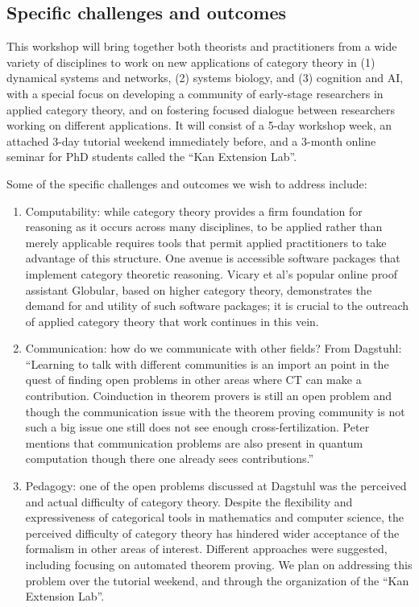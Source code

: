 \documentclass{article}
\newcommand{\redout}[1]{{\color{red}#1}}
\begin{document}

\subsection{Specific challenges and outcomes}
This workshop will bring together both theorists and practitioners from a wide variety of disciplines to work on new applications of category theory in (1) dynamical systems and networks, (2) systems biology, and (3) cognition and AI, with a special focus on developing a community of early-stage researchers in applied category theory, and on fostering focused dialogue between researchers working on different applications. It will consist of a 5-day workshop week, an attached 3-day tutorial weekend immediately before, and a 3-month online seminar for PhD students called the ``Kan Extension Lab''.

Some of the specific challenges and outcomes we wish to address include:
\begin{enumerate}
  \item Computability: while category theory provides a firm foundation for reasoning as it occurs across many disciplines, to be applied rather than merely applicable requires tools that permit applied practitioners to take advantage of this structure. One avenue is accessible software packages that implement category theoretic reasoning.  Vicary et al's popular online proof assistant Globular, based on higher category theory, demonstrates the demand for and utility of such software packages; it is crucial to the outreach of applied category theory that work continues in this vein.
\item Communication: \redout{how do we communicate with other fields? From Dagstuhl: ``Learning to talk with different communities is an import an point in the quest of finding open problems in other areas where CT can make a contribution. Coinduction in theorem provers is still an open problem and though the communication issue with the theorem proving community is not such a big issue one still does not see enough cross-fertilization. Peter mentions that communication problems are also present in quantum computation though there one already sees contributions.''}
\item Pedagogy: one of the open problems discussed at Dagstuhl was the perceived and actual difficulty of category theory. Despite the flexibility and expressiveness of categorical tools in mathematics and computer science, the perceived difficulty of category theory has hindered wider acceptance of the formalism in other areas of interest. Different approaches were suggested, including focusing on automated theorem proving. We plan on addressing this problem over the tutorial weekend, and through the organization of the ``Kan Extension Lab''.
\end{enumerate}
\end{document}

